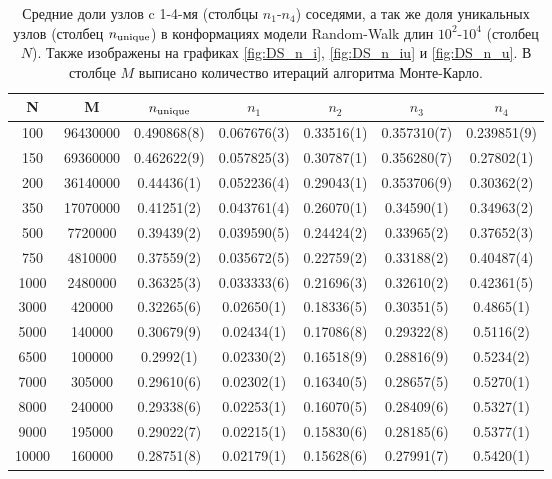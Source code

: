 \begin{table}[h]
    \centering

\begin{tabular}{|c|c|c|c|c|c|c|}
\hline
N & M & $ n_{\textup{unique}} $ & $n_{1}$ & $n_{2}$ & $n_{3}$ & $n_{4}$ \\ \hline
100 & 96430000 & 0.490868(8) & 0.067676(3) & 0.33516(1) & 0.357310(7) & 0.239851(9) \\ \hline
150 & 69360000 & 0.462622(9) & 0.057825(3) & 0.30787(1) & 0.356280(7) & 0.27802(1) \\ \hline
200 & 36140000 & 0.44436(1) & 0.052236(4) & 0.29043(1) & 0.353706(9) & 0.30362(2) \\ \hline
350 & 17070000 & 0.41251(2) & 0.043761(4) & 0.26070(1) & 0.34590(1) & 0.34963(2) \\ \hline
500 & 7720000 & 0.39439(2) & 0.039590(5) & 0.24424(2) & 0.33965(2) & 0.37652(3) \\ \hline
750 & 4810000 & 0.37559(2) & 0.035672(5) & 0.22759(2) & 0.33188(2) & 0.40487(4) \\ \hline 
1000 & 2480000 & 0.36325(3) & 0.033333(6) & 0.21696(3) & 0.32610(2) & 0.42361(5) \\ \hline
3000 & 420000 & 0.32265(6) & 0.02650(1) & 0.18336(5) & 0.30351(5) & 0.4865(1) \\ \hline
5000 & 140000 & 0.30679(9) & 0.02434(1) & 0.17086(8) & 0.29322(8) & 0.5116(2) \\ \hline
6500 & 100000 & 0.2992(1) & 0.02330(2) & 0.16518(9) & 0.28816(9) & 0.5234(2) \\ \hline
7000 & 305000 & 0.29610(6) & 0.02302(1) & 0.16340(5) & 0.28657(5) & 0.5270(1) \\ \hline
8000 & 240000 & 0.29338(6) & 0.02253(1) & 0.16070(5) & 0.28409(6) & 0.5327(1) \\ \hline
9000 & 195000 & 0.29022(7) & 0.02215(1) & 0.15830(6) & 0.28185(6) & 0.5377(1) \\ \hline
10000 & 160000 & 0.28751(8) & 0.02179(1) & 0.15628(6) & 0.27991(7) & 0.5420(1) \\ \hline
\end{tabular}

    \caption{Средние доли узлов c 1-4-мя (столбцы $n_1$-$n_4$) соседями, а так же доля уникальных узлов (столбец $n_{\textup{unique}}$) в конформациях модели Random-Walk длин $10^{2}$-$10^{4}$ (столбец $N$). Также изображены на графиках \ref{fig:DS_n_i}, \ref{fig:DS_n_iu} и \ref{fig:DS_n_u}. В столбце $M$ выписано количество итераций алгоритма Монте-Карло.}
    \label{tab:Ran_Walk_neigh}
\end{table}


